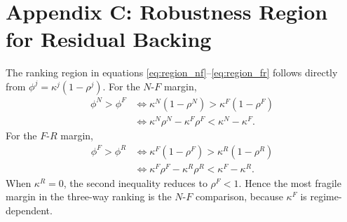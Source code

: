 \documentclass[12pt,a4paper]{article}
\begin{document}
\section{Appendix C: Robustness Region for Residual Backing}

The ranking region in equations \eqref{eq:region_nf}--\eqref{eq:region_fr} follows directly from \(\phi^j=\kappa^j(1-\rho^j)\). For the \(N\)-\(F\) margin,
\begin{align}
\phi^N>\phi^F
&\iff
\kappa^N(1-\rho^N)>\kappa^F(1-\rho^F) \\
&\iff
\kappa^N\rho^N-\kappa^F\rho^F<\kappa^N-\kappa^F.
\end{align}
For the \(F\)-\(R\) margin,
\begin{align}
\phi^F>\phi^R
&\iff
\kappa^F(1-\rho^F)>\kappa^R(1-\rho^R) \\
&\iff
\kappa^F\rho^F-\kappa^R\rho^R<\kappa^F-\kappa^R.
\end{align}
When \(\kappa^R=0\), the second inequality reduces to \(\rho^F<1\). Hence the most fragile margin in the three-way ranking is the \(N\)-\(F\) comparison, because \(\kappa^F\) is regime-dependent.
\end{document}
